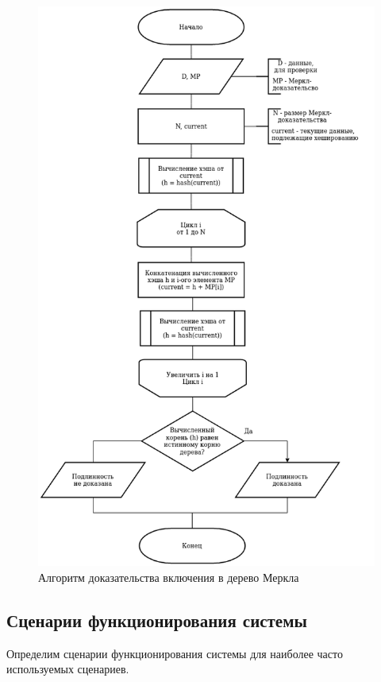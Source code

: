 \begin{figure}[hbtp]
	\centering
	\includegraphics[height=\textheight - 40pt]{img/merkle_proof.png}
	\caption{Алгоритм доказательства включения в дерево Меркла}
	\label{fig:a7}
\end{figure}




\subsection{Сценарии функционирования системы}

Определим сценарии функционирования системы для наиболее часто используемых сценариев.

